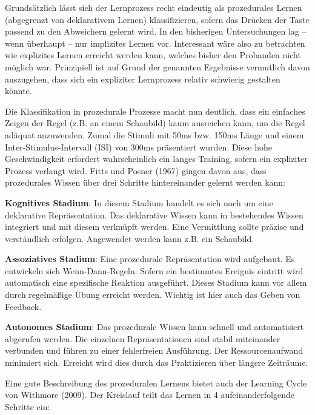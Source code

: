 \documentclass[doc,a4paper,12pt]{apa6}
\begin{document}
Grundsätzlich lässt sich der Lernprozess recht eindeutig als prozedurales Lernen (abgegrenzt von deklarativem Lernen) klassifizieren, sofern das Drücken der Taste passend zu den Abweichern gelernt wird. In den bisherigen Untersuchungen lag – wenn überhaupt – nur implizites Lernen vor. Interessant wäre also zu betrachten wie explizites Lernen erreicht werden kann, welches bisher den Probanden nicht möglich war. Prinzipiell ist auf Grund der genannten Ergebnisse vermutlich davon auszugehen, dass sich ein expliziter Lernprozess relativ schwierig gestalten könnte.

Die Klassifikation in prozedurale Prozesse macht nun deutlich, dass ein einfaches Zeigen der Regel (z.B. an einem Schaubild) kaum ausreichen kann, um die Regel adäquat anzuwenden. Zumal die Stimuli mit 50ms bzw. 150ms Länge und einem Inter-Stimulus-Intervall (ISI) von 300ms präsentiert wurden. Diese hohe Geschwindigkeit erfordert wahrscheinlich ein langes Training, sofern ein expliziter Prozess verlangt wird. Fitts und Posner (1967) gingen davon aus, dass prozedurales Wissen über drei Schritte hintereinander gelernt werden kann:

\begin{compactenum}
  \item \textbf{Kognitives Stadium}: In diesem Stadium handelt es sich noch um eine deklarative Repräsentation. Das deklarative Wissen kann in bestehendes Wissen integriert und mit diesem verknüpft werden. Eine Vermittlung sollte präzise und verständlich erfolgen. Angewendet werden kann z.B. ein Schaubild.
  \item \textbf{Assoziatives Stadium}: Eine prozedurale Repräsentation wird aufgebaut. Es entwickeln sich Wenn-Dann-Regeln. Sofern ein bestimmtes Ereignis eintritt wird automatisch eine spezifische Reaktion ausgeführt. Dieses Stadium kann vor allem durch regelmäßige Übung erreicht werden. Wichtig ist hier auch das Geben von Feedback.
  \item \textbf{Autonomes Stadium}: Das prozedurale Wissen kann schnell und automatisiert abgerufen werden. Die einzelnen Repräsentationen sind stabil miteinander verbunden und führen zu einer fehlerfreien Ausführung. Der Ressourcenaufwand minimiert sich. Erreicht wird dies durch das Praktizieren über längere Zeiträume.
\end{compactenum}

Eine gute Beschreibung des prozeduralen Lernens bietet auch der Learning Cycle von Withmore (2009). Der Kreislauf teilt das Lernen in 4 aufeinanderfolgende Schritte ein:
\end{document}
